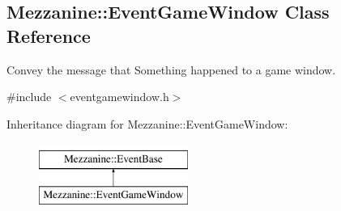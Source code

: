 \hypertarget{classMezzanine_1_1EventGameWindow}{
\subsection{Mezzanine::EventGameWindow Class Reference}
\label{classMezzanine_1_1EventGameWindow}
}


Convey the message that Something happened to a game window.  




{\ttfamily \#include $<$eventgamewindow.h$>$}

Inheritance diagram for Mezzanine::EventGameWindow:\begin{figure}[H]
\begin{center}
\leavevmode
\includegraphics[height=2.000000cm]{classMezzanine_1_1EventGameWindow}
\end{center}
\end{figure}
